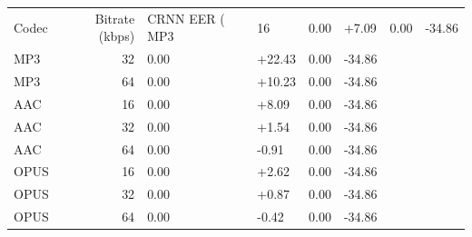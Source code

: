 \begin{tabular}{lrllll}
\toprule
Codec & Bitrate (kbps) & CRNN EER (%
\midrule
MP3 & 16 & 0.00 & +7.09 & 0.00 & -34.86 \\
MP3 & 32 & 0.00 & +22.43 & 0.00 & -34.86 \\
MP3 & 64 & 0.00 & +10.23 & 0.00 & -34.86 \\
AAC & 16 & 0.00 & +8.09 & 0.00 & -34.86 \\
AAC & 32 & 0.00 & +1.54 & 0.00 & -34.86 \\
AAC & 64 & 0.00 & -0.91 & 0.00 & -34.86 \\
OPUS & 16 & 0.00 & +2.62 & 0.00 & -34.86 \\
OPUS & 32 & 0.00 & +0.87 & 0.00 & -34.86 \\
OPUS & 64 & 0.00 & -0.42 & 0.00 & -34.86 \\
\bottomrule
\end{tabular}

